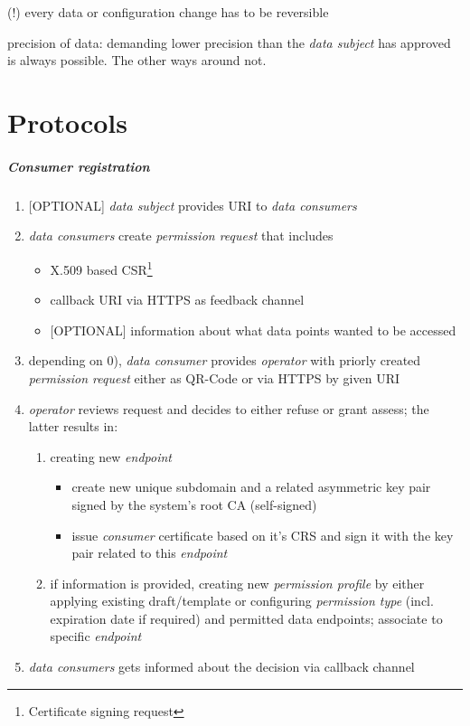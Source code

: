 \documentclass[12pt,english,a4paper,titlepage,cleardoublepage=empty,dottedtoc]{report}
\providecommand{\tightlist}{%
  \setlength{\itemsep}{0pt}\setlength{\parskip}{0pt}}
\begin{document}
(!) every data or configuration change has to be reversible

precision of data: demanding lower precision than the \emph{data
subject} has approved is always possible. The other ways around not.

\section{Protocols}\label{protocols}

\subparagraph{Consumer registration}\label{consumer-registration}

\begin{enumerate}
\def\labelenumi{\arabic{enumi})}
\setcounter{enumi}{-1}
\item
  {[}OPTIONAL{]} \emph{data subject} provides URI to \emph{data
  consumers}
\item
  \emph{data consumers} create \emph{permission request} that includes

  \begin{itemize}
  \tightlist
  \item
    X.509 based CSR\footnote{Certificate signing request}
  \item
    callback URI via HTTPS as feedback channel
  \item
    {[}OPTIONAL{]} information about what data points wanted to be
    accessed
  \end{itemize}
\item
  depending on 0), \emph{data consumer} provides \emph{operator} with
  priorly created \emph{permission request} either as QR-Code or via
  HTTPS by given URI
\item
  \emph{operator} reviews request and decides to either refuse or grant
  assess; the latter results in:

  \begin{enumerate}
  \def\labelenumii{\alph{enumii})}
  \tightlist
  \item
    creating new \emph{endpoint}

    \begin{itemize}
    \tightlist
    \item
      create new unique subdomain and a related asymmetric key pair
      signed by the system's root CA (self-signed)
    \item
      issue \emph{consumer} certificate based on it's CRS and sign it
      with the key pair related to this \emph{endpoint}
    \end{itemize}
  \item
    if information is provided, creating new \emph{permission profile}
    by either applying existing draft/template or configuring
    \emph{permission type} (incl. expiration date if required) and
    permitted data endpoints; associate to specific \emph{endpoint}
  \end{enumerate}
\item
  \emph{data consumers} gets informed about the decision via callback
  channel


\end{enumerate}
\end{document}
